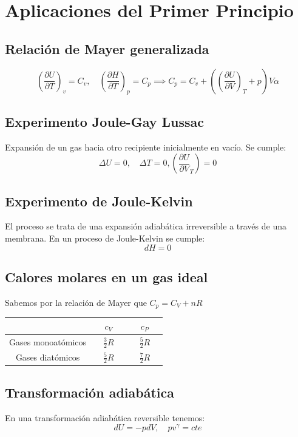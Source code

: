 \documentclass{myclass}
\begin{document}
\section{Aplicaciones del Primer Principio}
\subsection{Relación de Mayer generalizada}
\[
  \left( \frac{\partial U}{\partial T} \right)_v = C_v , \quad \left( \frac{\partial H}{\partial T} \right)_p=C_p \implies C_p=C_v + \left( \left( \frac{\partial U}{\partial V} \right)_T + p  \right)V\alpha 
\] 
\subsection{Experimento Joule-Gay Lussac}
Expansión de un gas hacia otro recipiente inicialmente en vacío. Se cumple:
\[
\Delta U = 0, \quad \Delta T=0, \left( \frac{\partial U}{\partial V}_T \right) =0
\] 

\subsection{Experimento de Joule-Kelvin}
El proceso se trata de una expansión adiabática irreversible a través de una membrana. En un proceso de Joule-Kelvin se cumple:
\[
dH=0 
\] 
\subsection{Calores molares en un gas ideal}
Sabemos por la relación de Mayer que $C_p = C_V + nR$
 \begin{center}
\begin{tabular}{|c|c|c|}
\hline
 & $c_V$ & $c_P$ \\
\hline 
  Gases monoatómicos & $\quad \frac{3}{2}R\quad$ & $\quad \frac{5}{2}R\quad$ \\
  \hline
  Gases diatómicos & $\quad\frac{5}{2}R\quad$ & $\quad\frac{7}{2}R\quad$ \\
  \hline

\end{tabular}
\end{center}

\subsection{Transformación adiabática}
En una transformación adiabática reversible tenemos:
\[
dU = -pdV, \quad pv^\gamma=cte
\] 
\end{document}
